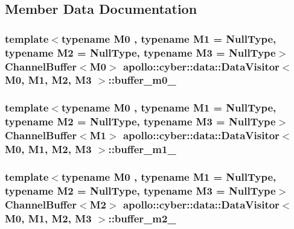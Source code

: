 \subsection{Member Data Documentation}
\hypertarget{classapollo_1_1cyber_1_1data_1_1DataVisitor_aadc37e90886bb1a67db1aacc04886d72}{
\subsubsection[{buffer\-\_\-m0\-\_\-}]{\setlength{\rightskip}{0pt plus 5cm}template$<$typename M0 , typename M1  = Null\-Type, typename M2  = Null\-Type, typename M3  = Null\-Type$>$ {\bf Channel\-Buffer}$<$M0$>$ {\bf apollo\-::cyber\-::data\-::\-Data\-Visitor}$<$ M0, M1, M2, M3 $>$\-::buffer\-\_\-m0\-\_\-\hspace{0.3cm}{\ttfamily [private]}}}\label{classapollo_1_1cyber_1_1data_1_1DataVisitor_aadc37e90886bb1a67db1aacc04886d72}
\hypertarget{classapollo_1_1cyber_1_1data_1_1DataVisitor_afd0449bddcb881e18ae46658d3ddb0a9}{
\subsubsection[{buffer\-\_\-m1\-\_\-}]{\setlength{\rightskip}{0pt plus 5cm}template$<$typename M0 , typename M1  = Null\-Type, typename M2  = Null\-Type, typename M3  = Null\-Type$>$ {\bf Channel\-Buffer}$<$M1$>$ {\bf apollo\-::cyber\-::data\-::\-Data\-Visitor}$<$ M0, M1, M2, M3 $>$\-::buffer\-\_\-m1\-\_\-\hspace{0.3cm}{\ttfamily [private]}}}\label{classapollo_1_1cyber_1_1data_1_1DataVisitor_afd0449bddcb881e18ae46658d3ddb0a9}
\hypertarget{classapollo_1_1cyber_1_1data_1_1DataVisitor_a2dc3d9334f9518e65a9819c63bf5fa63}{
\subsubsection[{buffer\-\_\-m2\-\_\-}]{\setlength{\rightskip}{0pt plus 5cm}template$<$typename M0 , typename M1  = Null\-Type, typename M2  = Null\-Type, typename M3  = Null\-Type$>$ {\bf Channel\-Buffer}$<$M2$>$ {\bf apollo\-::cyber\-::data\-::\-Data\-Visitor}$<$ M0, M1, M2, M3 $>$\-::buffer\-\_\-m2\-\_\-\hspace{0.3cm}{\ttfamily [private]}}}\label{classapollo_1_1cyber_1_1data_1_1DataVisitor_a2dc3d9334f9518e65a9819c63bf5fa63}
